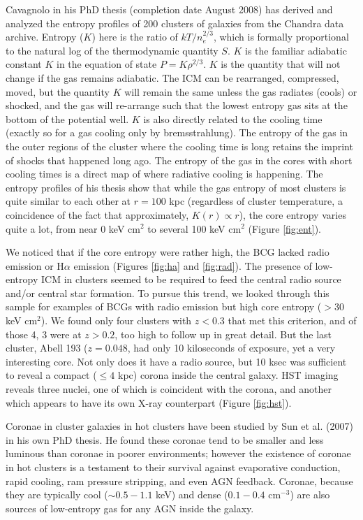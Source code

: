 \documentclass[letterpaper,11pt]{article}
\begin{document}
Cavagnolo in his PhD thesis (completion date August 2008) has derived
and analyzed the entropy profiles of 200 clusters of galaxies from the
Chandra data archive. Entropy ($K$) here is the ratio of
$kT/n_{e}^{2/3}$, which is formally proportional to the natural log of
the thermodynamic quantity $S$. $K$ is the familiar adiabatic
constant $K$ in the equation of state $P=K\rho^{2/3}$. $K$ is the
quantity that will not change if the gas remains adiabatic. The ICM
can be rearranged, compressed, moved, but the quantity $K$ will remain
the same unless the gas radiates (cools) or shocked, and the gas will
re-arrange such that the lowest entropy gas sits at the bottom of the
potential well. $K$ is also directly related to the cooling time
(exactly so for a gas cooling only by bremsstrahlung). The entropy of
the gas in the outer regions of the cluster where the cooling time is
long retains the imprint of shocks that happened long ago. The
entropy of the gas in the cores with short cooling times is a direct
map of where radiative cooling is happening. The entropy profiles of
his thesis show that while the gas entropy of most clusters is quite
similar to each other at $r=100$ kpc (regardless of cluster
temperature, a coincidence of the fact that approximately, $K(r)
\propto r$), the core entropy varies quite a lot, from near 0 keV
cm$^2$ to several 100 keV cm$^2$ (Figure \ref{fig:ent}).

We noticed that if the core entropy were rather high, the BCG lacked
radio emission or H$\alpha$ emission (Figures \ref{fig:ha} and
\ref{fig:rad}). The presence of low-entropy ICM in clusters seemed to
be required to feed the central radio source and/or central star
formation. To pursue this trend, we looked through this sample for
examples of BCGs with radio emission but high core entropy ($>30$ keV
cm$^2$). We found only four clusters with $z<0.3$ that met this
criterion, and of those 4, 3 were at $z>0.2$, too high to follow up in
great detail. But the last cluster, Abell 193 ($z=0.048$, had only 10
kiloseconds of exposure, yet a very interesting core. Not only does it
have a radio source, but 10 ksec was sufficient to reveal a compact
($\leq 4$ kpc) corona inside the central galaxy. HST imaging
reveals three nuclei, one of which is coincident with the corona,
and another which appears to have its own X-ray counterpart (Figure
\ref{fig:hst}).

Coronae in cluster galaxies in hot clusters have been studied by Sun
et al. (2007) in his own PhD thesis. He found these coronae tend to be
smaller and less luminous than coronae in poorer environments; however
the existence of coronae in hot clusters is a testament to their
survival against evaporative conduction, rapid cooling, ram pressure
stripping, and even AGN feedback. Coronae, because they are typically
cool ($\sim0.5-1.1$ keV) and dense ($0.1-0.4$ cm$^{-3}$) are also
sources of low-entropy gas for any AGN inside the galaxy.
\end{document}

